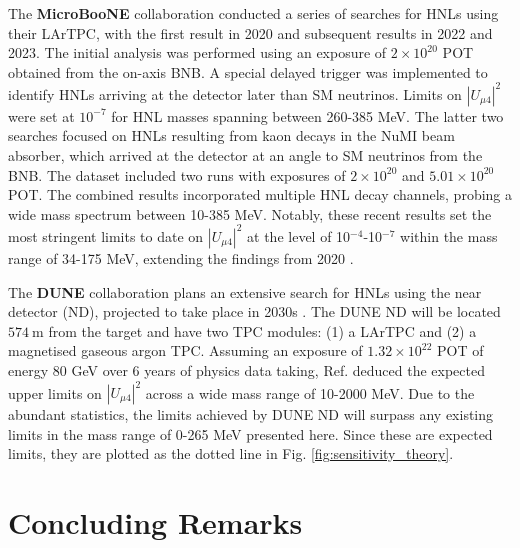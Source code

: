\begin{coloritemize}
\item The \textbf{MicroBooNE} collaboration conducted a series of searches for HNLs using their LArTPC, with the first result in 2020 and subsequent results in 2022 and 2023.
The initial analysis was performed using an exposure of $2 \times 10^{20}$ POT obtained from the on-axis BNB.
A special delayed trigger was implemented to identify HNLs arriving at the detector later than SM neutrinos.
Limits on $|U_{\mu4}|^{2}$ were set at $10^{-7}$ for HNL masses spanning between 260-385 MeV.
The latter two searches focused on HNLs resulting from kaon decays in the NuMI beam absorber, which arrived at the detector at an angle to SM neutrinos from the BNB.
The dataset included two runs with exposures of $2 \times 10^{20}$ and $5.01 \times 10^{20}$ POT.
The combined results incorporated multiple HNL decay channels, probing a wide mass spectrum between 10-385 MeV.
Notably, these recent results set the most stringent limits to date on $|U_{\mu4}|^{2}$ at the level of 10$^{-4}$-10$^{-7}$ within the mass range of 34-175 MeV, extending the findings from 2020 \cite{uboone1, uboone2, uboone3}.

\item The \textbf{DUNE} collaboration plans an extensive search for HNLs using the near detector (ND), projected to take place in 2030s \cite{DUNEND, HNLSilvia, HNLKelly}.
The DUNE ND will be located $574~\mathrm{m}$ from the target and have two TPC modules: (1) a LArTPC and (2) a magnetised gaseous argon TPC.
Assuming an exposure of $1.32 \times 10^{22}$ POT of energy 80 GeV over 6 years of physics data taking, Ref. \cite{HNLSilvia} deduced the expected upper limits on $|U_{\mu4}|^{2}$ across a wide mass 
range of 10-2000 MeV.
Due to the abundant statistics, the limits achieved by DUNE ND will surpass any existing limits in the mass range of 0-265 MeV presented here.
Since these are expected limits, they are plotted as the dotted line in Fig. \ref{fig:sensitivity_theory}.

\end{coloritemize}

\section{Concluding Remarks}
\label{sec2conclude}

